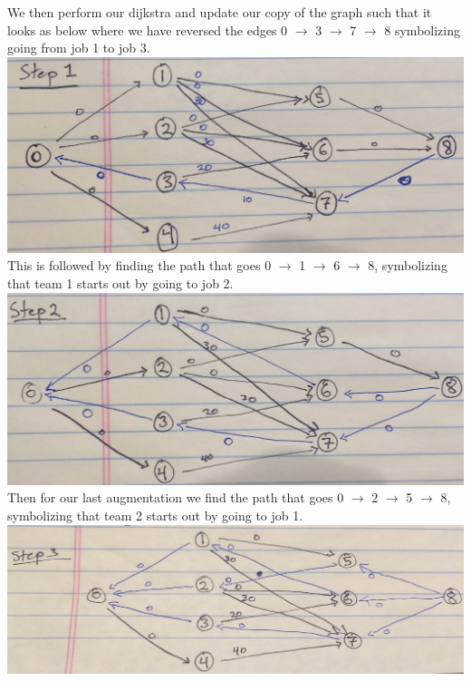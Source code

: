 \documentclass[12pt]{article}
\begin{document}
We then perform our dijkstra and update our copy of the graph such that it looks as below where we have
reversed the edges 0 $\rightarrow$ 3 $\rightarrow$ 7 $\rightarrow$ 8 symbolizing going from job 1 to job 3. \\
\includegraphics[width=\textwidth]{ExampleCpart2} \\

This is followed by finding the path that goes 0 $\rightarrow$ 1 $\rightarrow$ 6 $\rightarrow$ 8, symbolizing
that team 1 starts out by going to job 2. \\
\includegraphics[width=\textwidth]{ExampleCpart3} \\

Then for our last augmentation we find the path that goes 0 $\rightarrow$ 2 $\rightarrow$ 5 $\rightarrow$ 8,
symbolizing that team 2 starts out by going to job 1. \\
\includegraphics[width=\textwidth]{ExampleCpart4} \\
\end{document}
